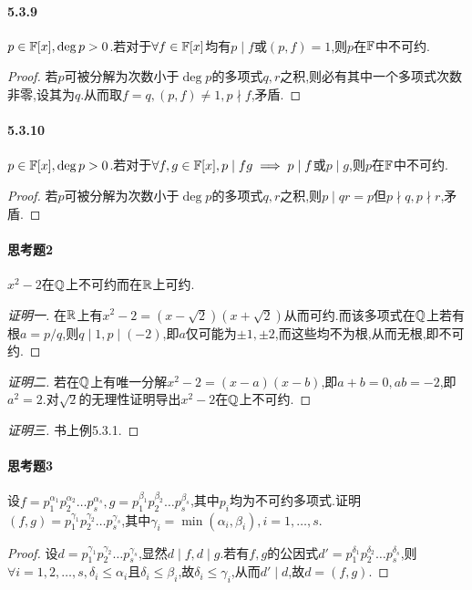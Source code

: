 \documentclass[11pt]{article}
\begin{document}
\paragraph{5.3.9}$p\in \mathbb{F}[x], \deg p>0$.若对于$\forall f\in \mathbb{F}[x]$均有$p\mid f$或$(p,f)=1$,则$p$在$\mathbb{F}$中不可约.
\begin{proof}
    若$p$可被分解为次数小于$\deg p$的多项式$q,r$之积,则必有其中一个多项式次数非零,设其为$q$.从而取$f=q, (p,f)\neq 1, p\nmid f$,矛盾.
\end{proof}
\paragraph{5.3.10}$p\in \mathbb{F}[x], \deg p>0$.若对于$\forall f,g\in \mathbb{F}[x], p\mid fg\implies p\mid f$或$p\mid g$,则$p$在$\mathbb{F}$中不可约.
\begin{proof}
    若$p$可被分解为次数小于$\deg p$的多项式$q,r$之积,则$p\mid qr=p$但$p\nmid q, p\nmid r$,矛盾.
\end{proof}

\paragraph{思考题2}$x^2-2$在$\mathbb{Q}$上不可约而在$\mathbb{R}$上可约.
\begin{proof}[证明一]
    在$\mathbb{R}$上有$x^2-2=(x-\sqrt{2})(x+\sqrt{2})$从而可约.而该多项式在$\mathbb{Q}$上若有根$a=p/q$,则$q\mid 1,p\mid (-2)$,即$a$仅可能为$\pm 1, \pm 2$,而这些均不为根,从而无根,即不可约.
\end{proof}
\begin{proof}[证明二]
    若在$\mathbb{Q}$上有唯一分解$x^2-2=(x-a)(x-b)$,即$a+b=0, ab=-2$,即$a^2=2$.对$\sqrt{2}$的无理性证明导出$x^2-2$在$\mathbb{Q}$上不可约.
\end{proof}
\begin{proof}[证明三]
    书上例5.3.1.
\end{proof}

\paragraph{思考题3}设$f=p_1^{\alpha_1}p_2^{\alpha_2}\dots p_s^{\alpha_s}, g=p_1^{\beta_1}p_2^{\beta_2}\dots p_s^{\beta_s}$,其中$p_i$均为不可约多项式.证明$(f,g)=p_1^{\gamma_1}p_2^{\gamma_2}\dots p_s^{\gamma_s}$,其中$\gamma_i=\min(\alpha_i,\beta_i), i=1,\dots,s$.

\begin{proof}
    设$d=p_1^{\gamma_1}p_2^{\gamma_2}\dots p_s^{\gamma_s}$,显然$d\mid f, d\mid g$.若有$f,g$的公因式$d'=p_1^{\delta_1}p_2^{\delta_2}\dots p_s^{\delta_s}$,则$\forall i=1,2,\dots,s, \delta_i\leq \alpha_i$且$\delta_i\leq \beta_i$,故$\delta_i\leq \gamma_i$,从而$d'\mid d$,故$d=(f,g)$.
\end{proof}
\end{document}
